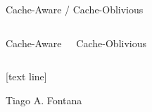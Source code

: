 {\begin{frame}{Cache-Aware / Cache-Oblivious}
     \begin{columns}
            Cache-Aware
            
            \vspace{0.3cm}
            
            \vspace{1cm}
            Cache-Oblivious
            
            \vspace{0.3cm}
            \vspace{12pt}
            
            \vspace{0.3cm}
            
            \vspace{1cm}
            \vspace{12pt}
            \vspace{0.3cm}
            \vspace{12pt}
            
            \vspace{0.3cm}
            
            \vspace{1cm}
            \vspace{12pt}
            \vspace{0.3cm}
    \end{columns}
\end{frame}


















[text line]{%
  \parbox{\linewidth}{\vspace*{-8pt} Tiago A. Fontana \hfill \insertdate  \hfill\insertframenumber}}
}